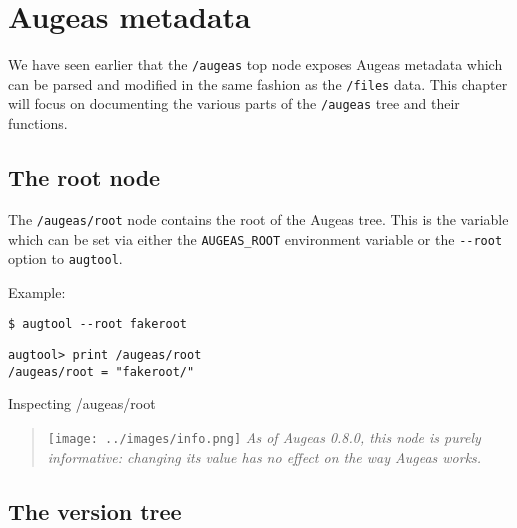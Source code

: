\chapter{Augeas metadata}


We have seen earlier that the \nolinkurl{/augeas} top node exposes Augeas metadata which can be parsed and modified in the same fashion as the \nolinkurl{/files} data. This chapter will focus on documenting the various parts of the \nolinkurl{/augeas} tree and their functions.

\section{The root node}

  

The \nolinkurl{/augeas/root} node contains the root of the Augeas tree. This is the variable which can be set via either the \verb!AUGEAS_ROOT! environment variable or the \verb!--root! option to \verb!augtool!.


Example:

\begin{listing}
  \begin{verbatim}
$ augtool --root fakeroot
  \end{verbatim}
  \begin{verbatim}
augtool> print /augeas/root
/augeas/root = "fakeroot/"
  \end{verbatim}
  \caption{Inspecting /augeas/root}
  \label{lst:metadata_root}
\end{listing}

\begin{quote}
\texttt{[image: ../images/info.png]} \emph{As of Augeas 0.8.0, this node is purely informative: changing its value has no effect on the way Augeas works.}

\end{quote}
\section{The version tree}


